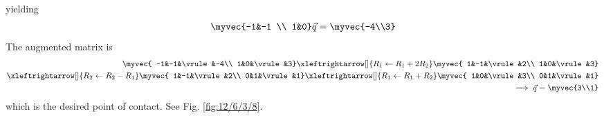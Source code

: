 yielding
\begin{align}
\myvec{-1&-1 \\ 1&0}\vec{q} = \myvec{-4\\3}
\end{align}
The augmented matrix is 
\begin{align*}
  \myvec{
                -1&-1&\vrule&-4\\
	        1&0&\vrule&3}
  \xleftrightarrow[]{R_1 \leftarrow R_1+ 2R_2}
     \myvec{
	         1&-1&\vrule&2\\
	         1&0&\vrule&3}
      \\
 \xleftrightarrow[]{R_2 \leftarrow R_2 - R_1}
     \myvec{
	         1&-1&\vrule&2\\
	         0&1&\vrule&1}
 \xleftrightarrow[]{R_1 \leftarrow R_1 + R_2}
     \myvec{
	         1&0&\vrule&3\\
	         0&1&\vrule&1}
      \\ \implies \vec{q}=\myvec{3\\1}
\end{align*}
which is the desired 
point of contact.
See Fig. 
		\ref{fig:12/6/3/8}.
